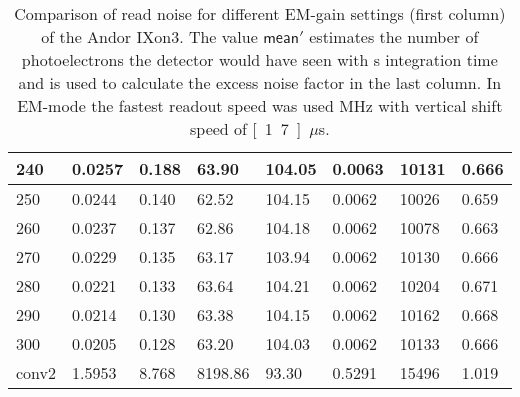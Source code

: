 \begin{table}[!htbp]
\begin{tabular}{|l|l|l|l|l|l|l|l|}
\hline
240 & 0.0257 & 0.188 & 63.90 & 104.05 & 0.0063 & 10131 & 0.666 \\
\hline
250 & 0.0244 & 0.140 & 62.52 & 104.15 & 0.0062 & 10026 & 0.659 \\
\hline
260 & 0.0237 & 0.137 & 62.86 & 104.18 & 0.0062 & 10078 & 0.663 \\
\hline
270 & 0.0229 & 0.135 & 63.17 & 103.94 & 0.0062 & 10130 & 0.666 \\
\hline
280 & 0.0221 & 0.133 & 63.64 & 104.21 & 0.0062 & 10204 & 0.671 \\
\hline
290 & 0.0214 & 0.130 & 63.38 & 104.15 & 0.0062 & 10162 & 0.668 \\
\hline
300 & 0.0205 & 0.128 & 63.20 & 104.03 & 0.0062 & 10133 & 0.666 \\
\hline
conv2 & 1.5953 & 8.768 & 8198.86 & 93.30 & 0.5291 & 15496 & 1.019 \\
\hline
\end{tabular}
  \caption{Comparison of read noise for different EM-gain settings
    (first column) of the Andor IXon3. The value $\textsf{mean}'$
    estimates the number of photoelectrons the detector would have
    seen with \unit[1]{s} integration time and is used to calculate
    the excess noise factor in the last column. In EM-mode the fastest
    readout speed was used \unit[10]{MHz} with vertical shift speed of
    \unit[1.7]{$\mu$s}.}
  \label{tab:ixon-table}
\end{table}


